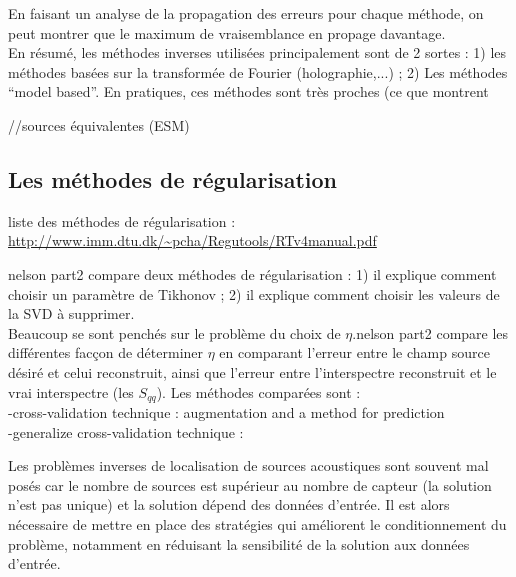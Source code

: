 En faisant un analyse de la propagation des erreurs pour chaque méthode, on peut montrer que le maximum de vraisemblance en propage davantage.\\

En résumé, les méthodes inverses utilisées principalement sont de 2 sortes : 1) les méthodes basées sur la transformée de Fourier (holographie,...) ; 2) Les méthodes ``model based''. En pratiques, ces méthodes sont très proches (ce que montrent %





//sources équivalentes (ESM)

\subsection{Les méthodes de régularisation}

liste des méthodes de régularisation : \url{http://www.imm.dtu.dk/~pcha/Regutools/RTv4manual.pdf}


nelson part2 compare deux méthodes de régularisation : 1) il explique comment choisir un paramètre de Tikhonov ; 2) il explique comment choisir les valeurs de la SVD à supprimer.\\ Beaucoup se sont penchés sur le problème du choix de $\eta$.nelson part2 compare les différentes facçon de déterminer $\eta$ en comparant l'erreur entre le champ source désiré et celui reconstruit, ainsi que l'erreur entre l'interspectre reconstruit et le vrai interspectre (les $S_{qq}$). Les méthodes comparées sont : \\
-cross-validation technique : %
augmentation and a method for prediction\\
-generalize cross-validation technique : %






Les problèmes inverses de localisation de sources acoustiques sont souvent mal posés car le nombre de sources est supérieur au nombre de capteur (la solution n'est pas unique) et la solution dépend des données d'entrée. Il est alors nécessaire de mettre en place des stratégies qui améliorent le conditionnement du problème, notamment en réduisant la sensibilité de la solution aux données d'entrée.\\


